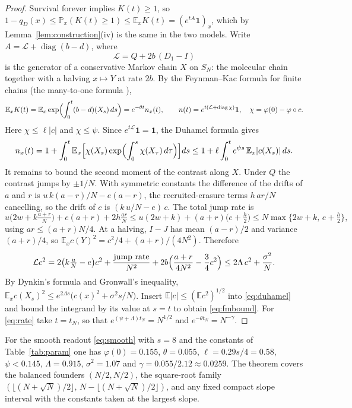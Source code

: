 \documentclass[11pt]{article}
\theoremstyle{remark}
\newcommand{\one}{\mathbf 1}
\newcommand{\E}{\mathbb E}
\newcommand{\PP}{\mathbb P}
\newcommand{\diag}{\operatorname{diag}}
\newcommand{\gen}{\mathcal L}
\begin{document}
\begin{proof}
Survival forever implies $K(t)\ge1$, so $1-q_D(x)\le\PP_x(K(t)\ge1)\le\E_xK(t)
=(e^{tA}\one)_x$, which by Lemma~\ref{lem:construction}(iv) is the same in the
two models. Write $A=\gen+\diag(b-d)$, where
\[
 \gen=Q+2b\,(D_1-I)
\]
is the generator of a conservative Markov chain $X$ on $S_N$: the molecular
chain together with a halving $x\mapsto Y$ at rate $2b$. By the Feynman--Kac
formula for finite chains (the many-to-one formula
\cite{bansaye2011,hardy2009}),
\[
 \E_xK(t)=\E_x\exp\Bigl(\int_0^t(b-d)(X_s)\,ds\Bigr)=e^{-\theta t}n_x(t),\qquad
 n(t)=e^{t(\gen+\diag\chi)}\one,\quad\chi=\varphi(0)-\varphi\circ c .
\]
Here $\chi\le\ell|c|$ and $\chi\le\psi$. Since $e^{t\gen}\one=\one$, the
Duhamel formula gives
\begin{equation}\label{eq:duhamel}
 n_x(t)=1+\int_0^t\E_x\Bigl[\chi(X_s)\exp\Bigl(\int_0^s\chi(X_\tau)\,d\tau\Bigr)\Bigr]ds
 \le1+\ell\int_0^te^{\psi s}\,\E_x|c(X_s)|\,ds .
\end{equation}
It remains to bound the second moment of the contrast along $X$. Under $Q$
the contrast jumps by $\pm1/N$. With symmetric constants the difference of
the drifts of $a$ and $r$ is
$u\,k(a-r)/N-e(a-r)$, the recruited-erasure terms $h\,ar/N$ cancelling, so
the drift of $c$ is $(k\,u/N-e)\,c$. The total jump rate is
\[
 u\bigl(2w+k\tfrac{a+r}N\bigr)+e(a+r)+2h\tfrac{ar}N\le u(2w+k)+(a+r)\bigl(e+\tfrac h2\bigr)\le N\max\{2w+k,\,e+\tfrac h2\},
\]
using $ar\le(a+r)N/4$. At a halving, $I-J$ has mean $(a-r)/2$ and variance
$(a+r)/4$, so $\E_xc(Y)^2=c^2/4+(a+r)/(4N^2)$. Therefore
\[
 \gen c^2=2\bigl(k\tfrac uN-e\bigr)c^2+\frac{\text{jump rate}}{N^2}+2b\Bigl(\frac{a+r}{4N^2}-\frac34c^2\Bigr)
 \le2\Lambda\,c^2+\frac{\sigma^2}N .
\]
By Dynkin's formula and Gronwall's inequality,
$\E_xc(X_s)^2\le e^{2\Lambda s}\bigl(c(x)^2+\sigma^2s/N\bigr)$. Insert
$\E|c|\le(\E c^2)^{1/2}$ into \eqref{eq:duhamel} and bound the integrand by
its value at $s=t$ to obtain \eqref{eq:fmbound}. For \eqref{eq:rate} take
$t=t_N$, so that $e^{(\psi+\Lambda)t_N}=N^{1/2}$ and
$e^{-\theta t_N}=N^{-\gamma}$.
\end{proof}

For the smooth readout \eqref{eq:smooth} with $s=8$ and the constants of
Table~\ref{tab:param} one has $\varphi(0)=0.155$, $\theta=0.055$,
$\ell=0.29s/4=0.58$, $\psi<0.145$, $\Lambda=0.915$, $\sigma^2=1.07$ and
$\gamma=0.055/2.12\approx0.0259$. The theorem covers the balanced founders
$(N/2,N/2)$, the square-root family
$(\lfloor(N+\sqrt N)/2\rfloor,\,N-\lfloor(N+\sqrt N)/2\rfloor)$, and any fixed
compact slope interval with the constants taken at the largest slope.
\end{document}
